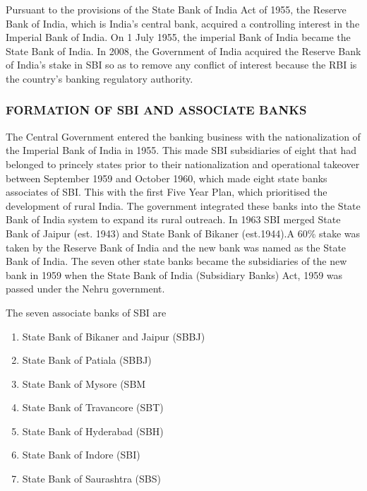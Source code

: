 \documentclass[a4paper, 12pt]{extarticle}
\begin{document}
{\par Pursuant to the provisions of the State Bank of India Act of 1955, the Reserve Bank of India, which is India's central bank, acquired a controlling interest in the Imperial Bank of India. On 1 July 1955, the imperial Bank of India became the State Bank of India. In 2008, the Government of India acquired the Reserve Bank of India's stake in SBI so as to remove any conflict of interest because the RBI is the country's banking regulatory authority.

\subsubsection{FORMATION OF SBI AND ASSOCIATE BANKS}
\par The Central Government entered the banking business with the nationalization of the Imperial Bank of India in 1955. This made SBI subsidiaries of eight that had belonged to princely states prior to their nationalization and operational takeover between September 1959 and October 1960, which made eight state banks associates of SBI. This with the first Five Year Plan, which prioritised the development of rural India. The government integrated these banks into the State Bank of India system to expand its rural outreach. In 1963 SBI merged State Bank of Jaipur (est. 1943) and State Bank of Bikaner (est.1944).A 60\% stake was taken by the Reserve Bank of India and the new bank was named as the State Bank of India. The seven other state banks became the subsidiaries of the new bank in 1959 when the State Bank of India (Subsidiary Banks) Act, 1959 was passed under the Nehru government.

The seven associate banks of SBI are
\begin{enumerate}
\item State Bank of Bikaner and Jaipur (SBBJ)
\item State Bank of Patiala (SBBJ)
\item State Bank of Mysore (SBM
\item State Bank of Travancore (SBT)
\item State Bank of Hyderabad (SBH)
\item State Bank of Indore (SBI)
\item State Bank of Saurashtra (SBS)
\end{enumerate}

}
\end{document}
